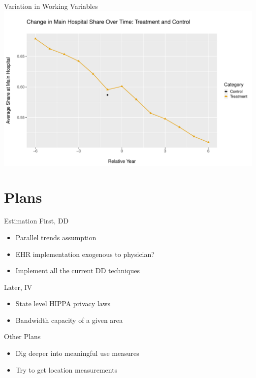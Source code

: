 \documentclass[10pt]{beamer}
\begin{document}
\begin{frame}{Variation in Working Variables}
    \centering
    \includegraphics[scale=.5]{Objects/rel_mainhosp_share_treatvscontrol.pdf}
\end{frame}




\section{Plans}

\begin{frame}{Estimation}
First, DD
\begin{itemize}
    \item Parallel trends assumption
    \item EHR implementation exogenous to physician?
    \item Implement all the current DD techniques
\end{itemize}

Later, IV
\begin{itemize}
    \item State level HIPPA privacy laws
    \item Bandwidth capacity of a given area
\end{itemize}
\end{frame}

\begin{frame}{Other Plans}
\begin{itemize}
    \item Dig deeper into meaningful use measures
    \item Try to get location measurements
\end{itemize}
    
\end{frame}
\end{document}
